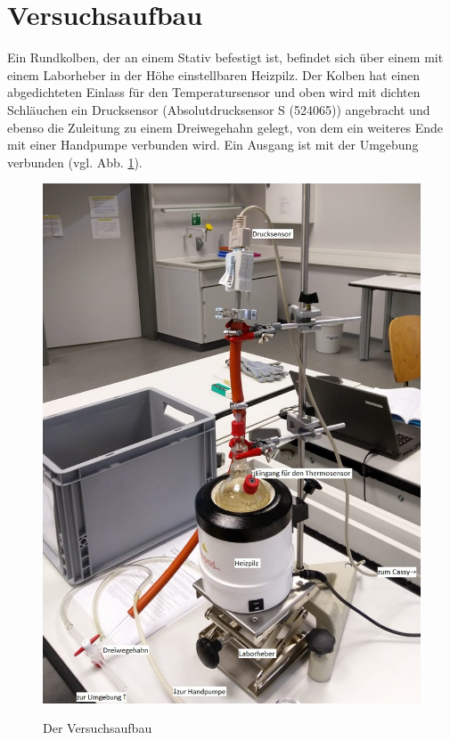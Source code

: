 \documentclass[]{article}
\begin{document}
\section{Versuchsaufbau}
Ein Rundkolben, der an einem Stativ befestigt ist, befindet sich über einem mit einem Laborheber in der Höhe einstellbaren Heizpilz. Der Kolben hat einen abgedichteten Einlass für den Temperatursensor und oben wird mit dichten Schläuchen ein Drucksensor (Absolutdrucksensor S (524065)) angebracht und ebenso die Zuleitung zu einem Dreiwegehahn gelegt, von dem ein weiteres Ende mit einer Handpumpe verbunden wird. Ein Ausgang ist mit der Umgebung verbunden (vgl. Abb. \ref{Aufbau}).
\begin{figure}
	\begin{center}
		\includegraphics[scale=0.85]{Images/Aufbau.jpg}
		\label{Aufbau}
		\caption{Der Versuchsaufbau}
	\end{center}
\end{figure}
\end{document}
